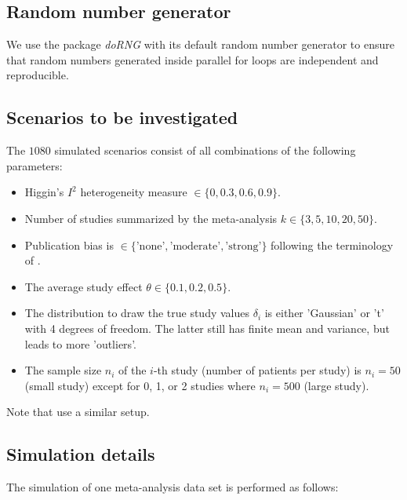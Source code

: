 \documentclass[letterpaper, 12pt]{article}
\newcommand{\pkg}[1]{\textit{#1}}
\begin{document}
\subsection{Random number generator}
We use the package \pkg{doRNG} \citep{doRNG} with its default random
number generator to ensure that random numbers generated inside parallel
for loops are independent and reproducible.


\subsection{Scenarios to be investigated} \label{sec:scenario}
The $1080$ simulated scenarios consist of all combinations
of the following parameters:
\begin{itemize}
\item Higgin's $I^2$ heterogeneity measure $\in \{0, 0.3, 0.6, 0.9\}$.
\item Number of studies summarized by the meta-analysis $k \in \{3, 5, 10, 20, 50\}$.
\item Publication bias is  $\in \{\text{'none'}, \text{'moderate'}, \text{'strong'}\}$
  following the terminology of \citet{henm:copa:10}. 
\item The average study effect $\theta \in \{0.1, 0.2, 0.5\}$. 
\item The distribution to draw the true study values $\delta_i$ is either
  'Gaussian' or 't' with 4 degrees of freedom. The latter still has finite mean
    and variance, but leads to more 'outliers'.
\item The sample size $n_i$ of the $i$-th study (number of patients per study)
  is $n_i = 50$ (small study) except for 0, 1, or 2 studies where
  $n_i=500$ (large study). 
\end{itemize}

Note that \citet{IntHoutIoannidis} use a similar setup.

\subsection{Simulation details}

The simulation of one meta-analysis data set is performed as follows:
\end{document}
